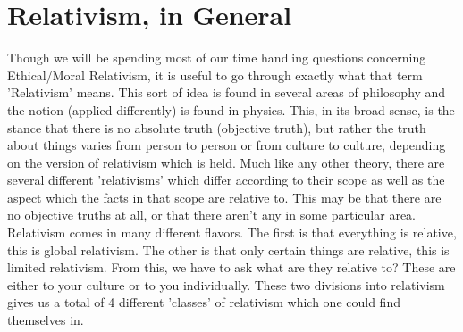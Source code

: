 \begin{center}
\end{center}


\section{Relativism, in General}

Though we will be spending most of our time handling questions concerning Ethical/Moral Relativism, it is useful to go through exactly what that term 'Relativism' means. This sort of idea is found in several areas of philosophy and the notion (applied differently) is found in physics. This, in its broad sense, is the stance that there is no absolute truth (objective truth), but rather the truth about things varies from person to person or from culture to culture, depending on the version of relativism which is held. Much like any other theory, there are several different 'relativisms' which differ according to their scope as well as the aspect which the facts in that scope are relative to.  This may be that there are no objective truths at all, or that there aren’t any in some particular area. Relativism comes in many different flavors. The first is that everything is relative, this is global relativism. The other is that only certain things are relative, this is limited relativism. From this, we have to ask what are they relative to? These are either to your culture or to you individually. These two divisions into relativism gives us a total of 4 different 'classes' of relativism which one could find themselves in.


